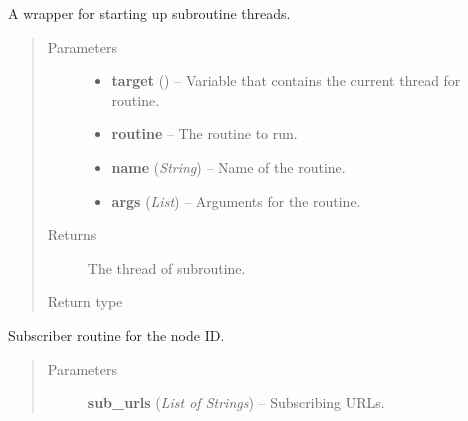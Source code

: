 \documentclass[letterpaper,10pt,english]{sphinxmanual}
\begin{document}
\begin{fulllineitems}
\begin{fulllineitems}
\end{fulllineitems}


\begin{fulllineitems}
\label{swnp:swnp.SWNP.start_sub_routine}
A wrapper for starting up subroutine threads.
\begin{quote}\begin{description}
\item[{Parameters}] \leavevmode\begin{itemize}
\item {} 
\textbf{target} () -- Variable that contains the current thread for routine.

\item {} 
\textbf{routine} -- The routine to run.

\item {} 
\textbf{name} (\emph{String}) -- Name of the routine.

\item {} 
\textbf{args} (\emph{List}) -- Arguments for the routine.

\end{itemize}

\item[{Returns}] \leavevmode
The thread of subroutine.

\item[{Return type}] \leavevmode
{}

\end{description}\end{quote}

\end{fulllineitems}


\begin{fulllineitems}
\label{swnp:swnp.SWNP.sub_routine}
Subscriber routine for the node ID.
\begin{quote}\begin{description}
\item[{Parameters}] \leavevmode
\textbf{sub\_urls} (\emph{List of Strings}) -- Subscribing URLs.

\end{description}\end{quote}


\end{fulllineitems}
\end{fulllineitems}
\end{document}
